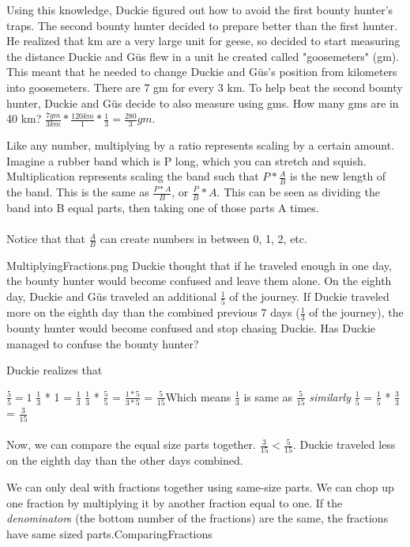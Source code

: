 {Using this knowledge, Duckie figured out how to avoid the first bounty hunter's traps. The second bounty hunter decided to prepare better than the first hunter. He realized that km are a very large unit for geese, so decided to start measuring the distance Duckie and Güs flew in a unit he created called "goosemeters" (gm). This meant that he needed to change Duckie and Güs's position from kilometers into goosemeters. There are 7 gm for every 3 km. To help beat the second bounty hunter, Duckie and Güs decide to also measure using gms. How many gms are in 40 km?}{
$\frac{7 gm}{3 km}*\frac{120 km}{1}*\frac{1}{3}=\frac{280}{3} gm$.
}{Like any number, multiplying by a ratio represents scaling by a certain amount. Imagine a rubber band which is P long, which you can stretch and squish. Multiplication represents scaling the band such that $P*\frac{A}{B}$ is the new length of the band. This is the same as $\frac{P*A}{B}$, or $\frac{P}{B}*A$. This can be seen as dividing the band into B equal parts, then taking one of those parts A times. \paragraph{} Notice that that $\frac{A}{B}$ can create numbers in between 0, 1, 2, etc.}{MultiplyingFractions.png}
{Duckie thought that if he traveled enough in one day, the bounty hunter would become confused and leave them alone. On the eighth day, Duckie and Güs traveled an additional $\frac{1}{5}$ of the journey. If Duckie traveled more on the eighth day than the combined previous 7 days ($\frac{1}{3}$ of the journey), the bounty hunter would become confused and stop chasing Duckie. Has Duckie managed to confuse the bounty hunter?}{Duckie realizes that \begin{center}
    $\frac{5}{5}=1$ \linebreak
    $\frac{1}{3}$ * 1 = $\frac{1}{3}$ \linebreak
    $\frac{1}{3}$ * $\frac{5}{5}$ = $\frac{1*5}{3*5}$ = $\frac{5}{15}$\linebreak  Which means $\frac{1}{3}$  is same as  $\frac{5}{15}$ \linebreak\linebreak
    \textit{similarly}
    $\frac{1}{5}$ = $\frac{1}{5}$ * $\frac{3}{3}$ = $\frac{3}{15}$
\end{center}
\paragraph{} Now, we can compare the equal size parts together. $\frac{3}{15} < \frac{5}{15}$. Duckie traveled less on the eighth day than the other days combined.}{We can only deal with fractions together using same-size parts. We can chop up one fraction by multiplying it by another fraction equal to one. If the \textit{denominator}s (the bottom number of the fractions) are the same, the fractions have same sized parts.}{ComparingFractions}
